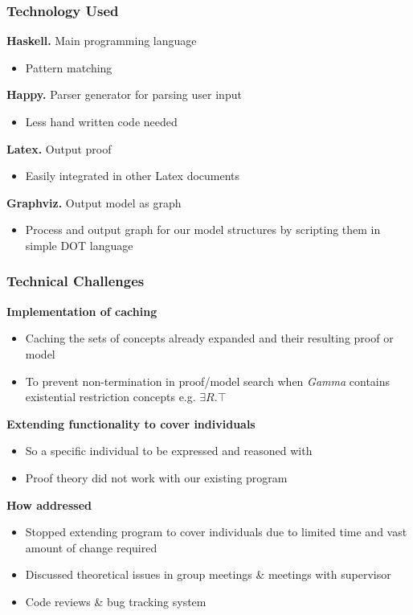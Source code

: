 \begin{frame}
  \frametitle{Technology Used}
\textbf{Haskell.} Main programming language
\begin{itemize}
\item Pattern matching
\end{itemize}
\smallskip
\textbf{Happy.} Parser generator for parsing user input
\begin{itemize}
\item Less hand written code needed
\end{itemize}
\smallskip
\textbf{Latex.} Output proof
\begin{itemize}
\item Easily integrated in other Latex documents
\end{itemize}
\smallskip
\textbf{Graphviz.} Output model as graph
\begin{itemize}
\item Process and output graph for our model structures by scripting them in simple DOT language
\end{itemize}
 \end{frame}

\begin{frame}
  \frametitle{Technical Challenges}
\textbf{Implementation of caching}
\begin{itemize}
\item Caching the sets of concepts already expanded and their resulting proof or model
\item To prevent non-termination in proof/model search when \textit{Gamma} contains existential restriction concepts e.g. $\exists R . \top$
\end{itemize}

\textbf{Extending functionality to cover individuals}
\begin{itemize}
\item So a specific individual to be expressed and reasoned with
\item Proof theory did not work with our existing program
\end{itemize}

\textbf{How addressed}
\begin{itemize}
\item Stopped extending program to cover individuals due to limited time and vast amount of change required
\item Discussed theoretical issues in group meetings \& meetings with supervisor
\item Code reviews \& bug tracking system
\end{itemize}
 \end{frame}

